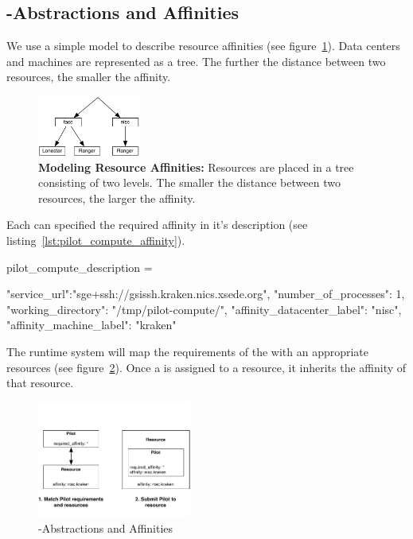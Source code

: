\documentclass[conference]{IEEEtran}
\begin{document}
\subsection{\pilot-Abstractions and Affinities}


We use a simple model to describe resource affinities (see
figure~\ref{fig:figures_resource-topologies}). Data centers and machines are
represented as a tree. The further the distance between two resources, the
smaller the affinity.

\begin{figure}[t]
	\centering
		\includegraphics[width=0.3\textwidth]{figures/resource-topologies.pdf}
	\caption{\textbf{Modeling Resource Affinities:} Resources are placed in a 
	tree consisting of two levels. The smaller the distance between two 
	resources, the larger the affinity.}
	\label{fig:figures_resource-topologies}
\end{figure}

Each \pilot can specified the required affinity in it's description (see
listing~\ref{lst:pilot_compute_affinity}).

\begin{code}[
caption={Creation of a \textit{PilotCompute} on the specified  compute
resource endpoint.},
label={lst:pilot_compute_affinity}]
pilot_compute_description = 

{
    "service_url":"sge+ssh://gsissh.kraken.nics.xsede.org",
    "number_of_processes": 1,                             
    "working_directory": "/tmp/pilot-compute/",
    "affinity_datacenter_label": "nisc",              
    "affinity_machine_label": "kraken" 
}
\end{code}

The runtime system will map the requirements of the \pilot with an appropriate
resources (see figure~\ref{fig:figures_pilot-affinities}). Once a \pilot is
assigned to a resource, it inherits the affinity of that resource.

\begin{figure}[t]
	\centering
	\includegraphics[width=0.45\textwidth]{figures/pilot-affinities.pdf}
	\caption{\pilot-Abstractions and Affinities}
	\label{fig:figures_pilot-affinities}
\end{figure}
\end{document}
